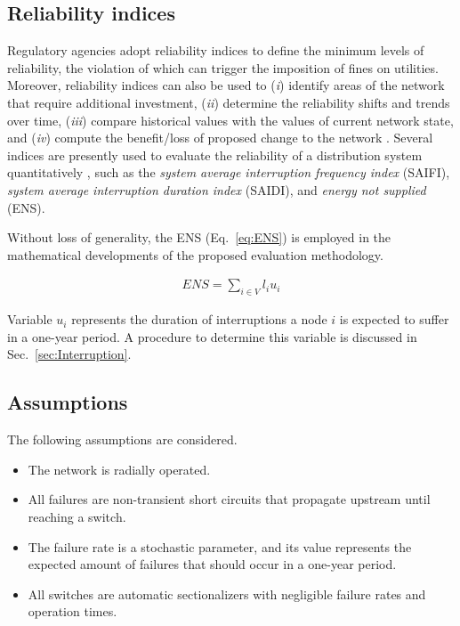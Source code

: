 \documentclass{article}
\begin{document}
\subsection{Reliability indices} \label{sec:indices}

Regulatory agencies adopt reliability indices to define the minimum levels of reliability, the violation of which can trigger the imposition of fines on utilities. Moreover, reliability indices can also be used to (\textit{i}) identify areas of the network that require additional investment, (\textit{ii}) determine the reliability shifts and trends over time, (\textit{iii}) compare historical values with the values of current network state, and (\textit{iv}) compute the benefit/loss of proposed change to the network \cite{brown2008}.
Several indices are presently used to evaluate  the reliability of a distribution system quantitatively \cite{billinton}, such as the \textit{system average interruption frequency index} (SAIFI), \textit{system average interruption duration index} (SAIDI), and \textit{energy not supplied} (ENS). 


Without loss of generality, the ENS (Eq.~\ref{eq:ENS}) is employed in the mathematical developments of the proposed evaluation methodology.

\begin{align} 
ENS = \sum_{i \in V}{\displaystyle l_iu_i} \label{eq:ENS}
\end{align}


Variable $u_i$ represents the duration of interruptions a node $i$ is expected to suffer in a one-year period. A procedure to determine this variable is discussed in Sec.~\ref{sec:Interruption}.



\subsection{Assumptions}

The following assumptions are considered.

\begin{itemize}
	\item The network is radially operated.
	\item All failures are non-transient short circuits that propagate upstream until reaching a switch.
	\item The failure rate is a stochastic parameter, and its value represents the expected amount of failures that should occur in a one-year period.
	\item All switches are automatic sectionalizers with negligible failure rates and operation times. 
\end{itemize}
\end{document}
